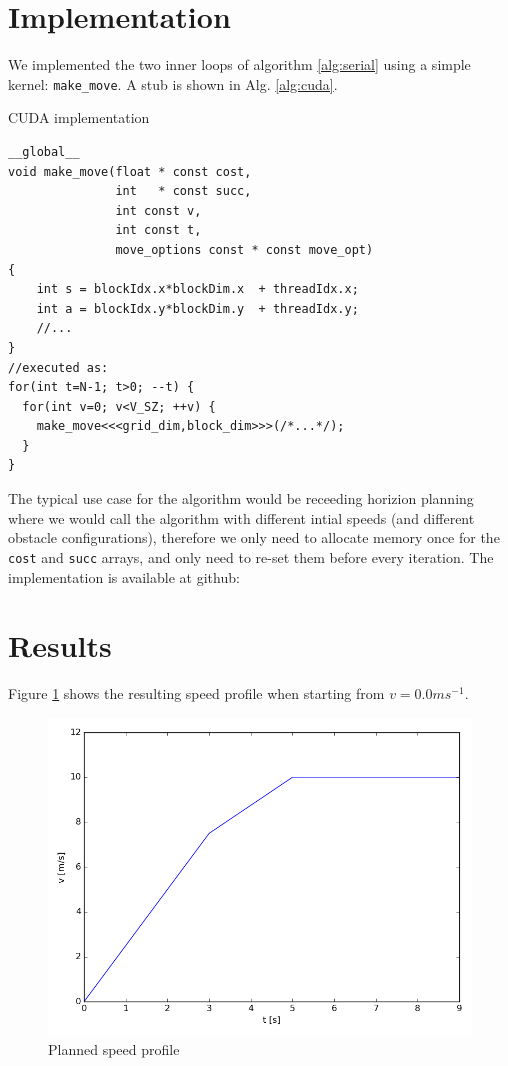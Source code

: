 \documentclass[a4paper,10pt,twocolumn]{article}
\begin{document}
\section{Implementation}

We implemented the two inner loops of algorithm \ref{alg:serial}
using a simple kernel: \verb|make_move|. A stub is shown in 
Alg. \ref{alg:cuda}.

\begin{algorithm}
\center
\caption{CUDA implementation}
\label{alg:cuda}
\begin{footnotesize}
\begin{verbatim}
__global__ 
void make_move(float * const cost,
               int   * const succ,
               int const v,
               int const t,
               move_options const * const move_opt) 
{
    int s = blockIdx.x*blockDim.x  + threadIdx.x;
    int a = blockIdx.y*blockDim.y  + threadIdx.y;
    //...
}
//executed as:
for(int t=N-1; t>0; --t) {
  for(int v=0; v<V_SZ; ++v) {
    make_move<<<grid_dim,block_dim>>>(/*...*/);
  }
}
\end{verbatim}
\end{footnotesize}
\end{algorithm}


The typical use case for the algorithm would be receeding horizion
planning where we would call the algorithm with different intial 
speeds (and different obstacle configurations), therefore 
we only need to allocate memory once for the \verb|cost| and \verb|succ| arrays, and only need to re-set them before every iteration.
The implementation is available at github: 

\section{Results}

Figure \ref{fig:speed_prof} shows the resulting speed profile when
starting from $v=0.0 ms^{-1}$. 

\begin{figure}
  \includegraphics[width=0.9\linewidth]{figure_1.png}
  \caption{Planned speed profile}
  \label{fig:speed_prof}
\end{figure}
\end{document}
